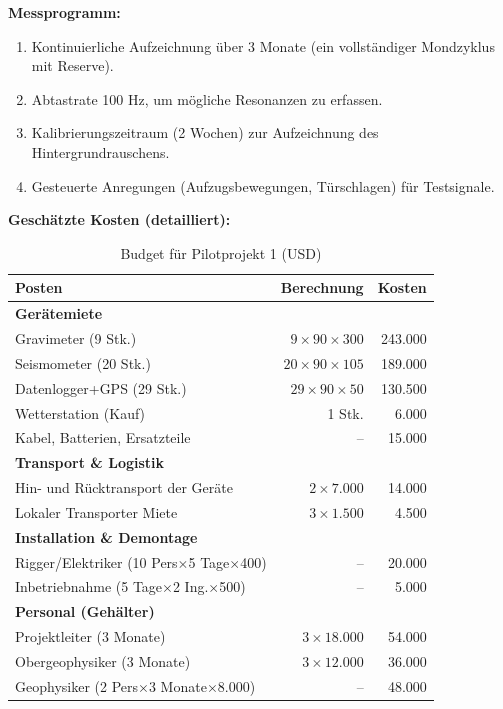\documentclass[12pt,a4paper]{article}
\theoremstyle{remark}
\begin{document}
	\textbf{Messprogramm:}
	\begin{enumerate}
		\item Kontinuierliche Aufzeichnung über 3 Monate (ein vollständiger Mondzyklus mit Reserve).
		\item Abtastrate 100 Hz, um mögliche Resonanzen zu erfassen.
		\item Kalibrierungszeitraum (2 Wochen) zur Aufzeichnung des Hintergrundrauschens.
		\item Gesteuerte Anregungen (Aufzugsbewegungen, Türschlagen) für Testsignale.
	\end{enumerate}
	
	\textbf{Geschätzte Kosten (detailliert):}
	\begin{table}[htbp]
		\centering
		\caption{Budget für Pilotprojekt 1 (USD)}
		\label{tab:budget-building}
		\small
		\begin{tabular}{lrr}
			\toprule
			\textbf{Posten} & \textbf{Berechnung} & \textbf{Kosten} \\
			\midrule
			\multicolumn{3}{l}{\textbf{Gerätemiete}} \\
			Gravimeter (9 Stk.) & $9\times90\times300$ & 243.000 \\
			Seismometer (20 Stk.) & $20\times90\times105$ & 189.000 \\
			Datenlogger+GPS (29 Stk.) & $29\times90\times50$ & 130.500 \\
			Wetterstation (Kauf) & 1 Stk. & 6.000 \\
			Kabel, Batterien, Ersatzteile & – & 15.000 \\
			\multicolumn{3}{l}{\textbf{Transport \& Logistik}} \\
			Hin- und Rücktransport der Geräte & $2\times7.000$ & 14.000 \\
			Lokaler Transporter Miete & $3\times1.500$ & 4.500 \\
			\multicolumn{3}{l}{\textbf{Installation \& Demontage}} \\
			Rigger/Elektriker (10 Pers$\times$5 Tage$\times$400) & – & 20.000 \\
			Inbetriebnahme (5 Tage$\times$2 Ing.$\times$500) & – & 5.000 \\
			\multicolumn{3}{l}{\textbf{Personal (Gehälter)}} \\
			Projektleiter (3 Monate) & $3\times18.000$ & 54.000 \\
			Obergeophysiker (3 Monate) & $3\times12.000$ & 36.000 \\
			Geophysiker (2 Pers$\times$3 Monate$\times$8.000) & – & 48.000 \\

\end{tabular}
\end{table}
\end{document}
